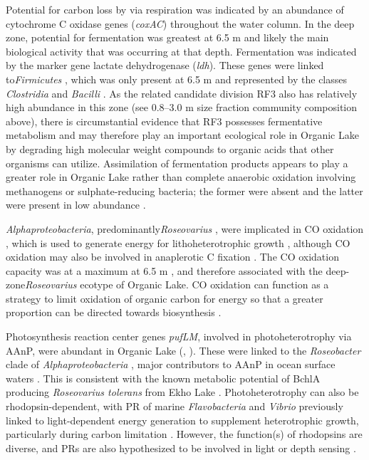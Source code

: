 Potential for carbon loss by via respiration was indicated by an abundance of cytochrome C oxidase genes (\emph{coxAC}) throughout the water column. 
In the deep zone, potential for fermentation was greatest at 6.5 m  and likely the main biological activity that was occurring at that depth. 
Fermentation was indicated by the marker gene lactate dehydrogenase (\emph{ldh}).
These genes were linked to\emph{Firmicutes} , which was only present at 6.5 m and represented by the classes \emph{Clostridia} and \emph{Bacilli} . 
As the related candidate division RF3 \cite{Tajima1999} also has relatively high abundance in this zone 
(see 0.8--3.0 \textmu{}m size fraction community composition above), %
there is circumstantial evidence that RF3 possesses fermentative metabolism and may therefore play an important ecological role in Organic Lake by degrading high molecular weight compounds to organic acids that other organisms can utilize. 
Assimilation of fermentation products appears to play a greater role in Organic Lake rather than complete anaerobic oxidation involving methanogens or sulphate-reducing bacteria; the former were absent and the latter were present in low abundance . 

\emph{Alphaproteobacteria}, predominantly\emph{Roseovarius} , were implicated in CO oxidation , which is used to generate energy for lithoheterotrophic growth \cite{Moran2007b}, although CO oxidation may also be involved in anaplerotic C fixation \cite{Moran2007b}. 
The CO oxidation capacity was at a maximum at 6.5 m , and therefore associated with the deep-zone\emph{Roseovarius} ecotype of Organic Lake. 
CO oxidation can function as a strategy to limit oxidation of organic carbon for energy so that a greater proportion can be directed towards biosynthesis \cite{Moran2007b}.

Photosynthesis reaction center genes \emph{pufLM}, involved in photoheterotrophy via \ac{AAnP}, were abundant in Organic Lake (, ). 
These were linked to the \emph{Roseobacter} clade of \emph{Alphaproteobacteria} , major contributors to \ac{AAnP} in ocean surface waters \cite{Beja2002, Moran2007b}. 
This is consistent with the known metabolic potential of \ac{BchlA} producing \emph{Roseovarius tolerans} from Ekho Lake \cite{Labrenz1999}. 
Photoheterotrophy can also be rhodopsin-dependent, with \ac{PR} of marine \emph{Flavobacteria} and \emph{Vibrio} previously linked to light-dependent energy generation to supplement heterotrophic growth, particularly during carbon limitation \cite{Gomez-Consarnau2007, Gomez-Consarnau2010}. 
However, the function(s) of rhodopsins are diverse, and \acp{PR} are also hypothesized to be involved in light or depth sensing \cite{Fuhrman2008}. 

